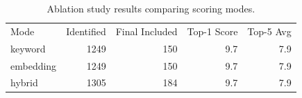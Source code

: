 \begin{table}[h]
\centering
\caption{Ablation study results comparing scoring modes.}
\label{tab:ablation}
\begin{tabular}{lrrrr}
\toprule
Mode & Identified & Final Included & Top-1 Score & Top-5 Avg \\
keyword & 1249 & 150 & 9.7 & 7.9 \\
embedding & 1249 & 150 & 9.7 & 7.9 \\
hybrid & 1305 & 184 & 9.7 & 7.9 \\
\bottomrule
\end{tabular}
\end{table}